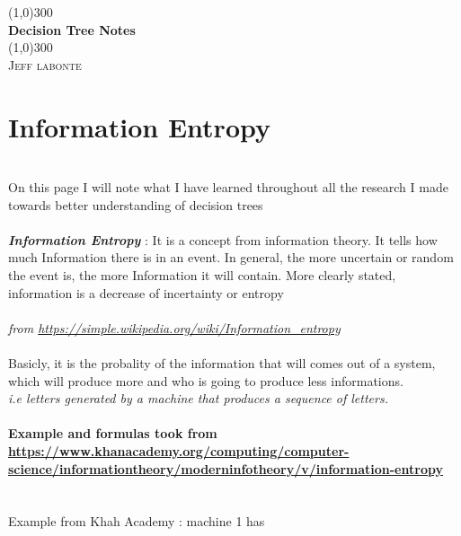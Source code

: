 \documentclass{article}
\begin{document}
  \begin{titlepage}
    \begin{center}
      \line(1,0){300} \\
      [0.25in]
      \huge{\bfseries Decision Tree Notes}\\
      [2mm]
      \line(1,0){300}\\
      [1.5cm]
      \textsc{\LARGE Jeff labonte}\\
      [0.75cm]
    \end{center}
  \end{titlepage}

  \section{Information Entropy}
    \ \\[2mm]
    On this page I will note what I have learned throughout all the research I made
    towards better understanding of decision trees\\
    \\
    \textit{\textbf{Information Entropy}} : It is a concept from information theory. It tells how much Information
    there is in an event. In general, the more uncertain or random the event is, the more Information
    it will contain. More clearly stated, information is a decrease of incertainty or entropy \\
    \\
    [2mm]
    \textit{from \url{https://simple.wikipedia.org/wiki/Information_entropy}}
    \\
    [2mm]
    \\
    Basicly, it is the probality of the information that will comes out of a system,
    which will produce more and who is going to produce less informations.
    \\
    \textit{i.e letters generated by a machine that produces a sequence of letters.}
    \\
    [4mm]
    \\
    [5mm]
    \textbf{ Example and formulas took from \url{https://www.khanacademy.org/computing/computer-science/informationtheory/moderninfotheory/v/information-entropy}}\\
    \\
    [5mm]
    \\
    Example from Khah Academy : machine 1 has \\
    \\
\end{document}
